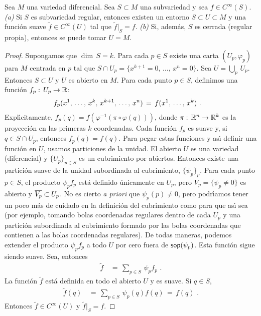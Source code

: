 \begin{lemaDeExtensiones}\label{thm:deextensiones}
	Sea $M$ una variedad diferencial. Sea $S\subset M$ una subvariedad
	y sea $f\in C^{\infty}(S)$. \emph{(a)} Si $S$ es subvariedad regular,
	entonces existen un entorno $S\subset U\subset M$ y una funci\'{o}n
	suave $\tilde{f}\in C^{\infty}(U)$ tal que $\tilde{f}|_{S}=f$.
	\emph{(b)} Si, adem\'{a}s, $S$ es cerrada (regular propia), entonces
	se puede tomar $U=M$.
\end{lemaDeExtensiones}

\begin{proof}
	Supongamos que $\dim\,S=k$. Para cada $p\in S$ existe una carta
	$(U_{p},\varphi_{p})$ para $M$ centrada en $p$ tal que
	$S\cap U_{p}=\{x^{k+1}=0,\,\dots,\,x^{n}=0\}$. Sea
	$U=\bigcup_{p}\,U_{p}$. Entonces $S\subset U$ y $U$ es abierto en
	$M$. Para cada punto $p\in S$, definimos una funci\'{o}n
	$f_{p}:\,U_{p}\rightarrow\mathbb{R}$:
	\begin{align*}
		f_{p}(\lista*{x}{k},\,x^{k+1},\,\dots,\,x^{n}) & \,=\,
			f(\lista*{x}{k})
		\text{ .}
	\end{align*}
	Expl\'{\i}citamente, $f_{p}(q)=f(\varphi^{-1}(\pi\circ\varphi(q)))$,
	donde $\pi:\,\mathbb{R}^{n}\rightarrow\mathbb{R}^{k}$ es la proyecci\'{o}n en
	las primeras $k$ coordenadas. Cada funci\'{o}n $f_{p}$ es suave y,
	si $q\in S\cap U_{p}$, entonces $f_{p}(q)=f(q)$.
	Para pegar estas funciones y as\'{\i} definir una funci\'{o}n
	en $U$, usamos particiones de la unidad. El abierto $U$ es una
	variedad (diferencial) y $\{U_{p}\}_{p\in S}$ es un cubrimiento por
	abiertos. Entonces existe una partici\'{o}n suave de la unidad
	subordinada al cubrimiento, $\{\psi_{p}\}_{p}$. Para cada punto
	$p\in S$, el producto $\psi_{p}f_{p}$ est\'{a} definido \'{u}nicamente
	en $U_{p}$, pero $V_{p}=\{\psi_{p}\not =0\}$ es abierto
	y $\overline{V_{p}}\subset U_{p}$. No es cierto \emph{a priori} que
	$\psi_{p}(p)\not =0$, pero podr\'{\i}amos tener un poco m\'{a}s
	de cuidado en la definici\'{o}n del cubrimiento como para que
	as\'{\i} sea (por ejemplo, tomando bolas coordenadas regulares
	dentro de cada $U_{p}$ y una partici\'{o}n subordinada al cubrimiento
	formado por las bolas coordenadas que contienen a las bolas
	coordenadas regulares). De todas maneras, podemos extender el
	producto $\psi_{p}f_{p}$ a todo $U$ por cero fuera de
	$\mathsf{sop}(\psi_{p})$. Esta funci\'{o}n sigue siendo suave. Sea,
	entonces
	\begin{align*}
		\tilde{f} & \,=\,\sum_{p\in S}\,\psi_{p}f_{p}
		\text{ .}
	\end{align*}
	La funci\'{o}n $\tilde{f}$ est\'{a} definida en todo el abierto
	$U$ y es suave. Si $q\in S$,
	\begin{align*}
		\tilde{f}(q) & \,=\,\sum_{p\in S}\,\psi_{p}(q)f(q) \,=\,f(q)
		\text{ .}
	\end{align*}
	Entonces $\tilde{f}\in C^{\infty}(U)$ y $\tilde{f}|_{S}=f$.


\end{proof}
